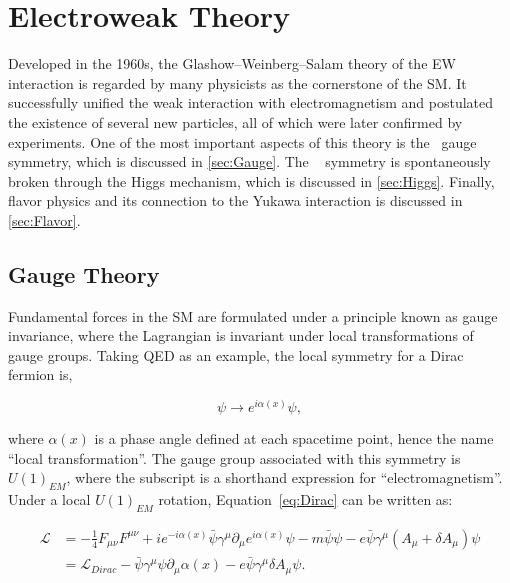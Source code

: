 \chapter{Electroweak Theory}
\label{chap:SM}

Developed in the 1960s, the Glashow–Weinberg–Salam theory of the \ac{EW} interaction is regarded by many physicists as the cornerstone of the \ac{SM}. It successfully unified the weak interaction with electromagnetism and postulated the existence of several new particles, all of which were later confirmed by experiments. One of the most important aspects of this theory is the \ew~gauge symmetry, which is discussed in \autoref{sec:Gauge}. The \ew~ symmetry is spontaneously broken through the Higgs mechanism, which is discussed in \autoref{sec:Higgs}. Finally, flavor physics and its connection to the Yukawa interaction is discussed in \autoref{sec:Flavor}. 

\section{Gauge Theory}
\label{sec:Gauge}

Fundamental forces in the \ac{SM} are formulated under a principle known as gauge invariance, where the Lagrangian is invariant under local transformations of gauge groups. Taking \ac{QED} as an example, the local symmetry for a Dirac fermion is,

\begin{equation}
\psi\rightarrow e^{i\alpha(x)}\psi,
\end{equation}

where $\alpha(x)$ is a phase angle defined at each spacetime point, hence the name ``local transformation''. The gauge group associated with this symmetry is $U(1)_{EM}$, where the subscript is a shorthand expression for ``electromagnetism''. Under a local $U(1)_{EM}$ rotation, Equation~\ref{eq:Dirac} can be written as:

\begin{equation}
\begin{split}
\label{eq:QEDGauge}
\mathcal{L}&=-\frac{1}{4}F_{\mu\nu}F^{\mu\nu}+ie^{-i\alpha(x)}\bar{\psi}\gamma^{\mu}\partial_{\mu}e^{i\alpha(x)}\psi-m\bar{\psi}\psi-e\bar{\psi}\gamma^{\mu}(A_{\mu}+\delta A_{\mu})\psi\\
&=\mathcal{L}_{Dirac}-\bar{\psi}\gamma^{\mu}\psi\partial_{\mu}\alpha(x)-e\bar{\psi}\gamma^{\mu}\delta A_{\mu}\psi.
\end{split}
\end{equation}

